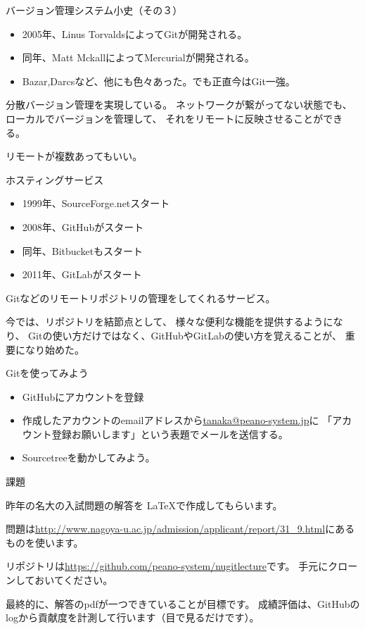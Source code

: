 \documentclass[12pt, unicode]{beamer}
\begin{document}
\begin{frame}{バージョン管理システム小史（その３）}
\begin{itemize}
\item 2005年、Linus TorvaldsによってGitが開発される。
\item 同年、Matt MckallによってMercurialが開発される。
\item Bazar,Darcsなど、他にも色々あった。でも正直今はGit一強。
\end{itemize}

分散バージョン管理を実現している。
ネットワークが繋がってない状態でも、
ローカルでバージョンを管理して、
それをリモートに反映させることができる。

リモートが複数あってもいい。

\end{frame}
\begin{frame}{ホスティングサービス}
\begin{itemize}
\item 1999年、SourceForge.netスタート
\item 2008年、GitHubがスタート
\item 同年、Bitbucketもスタート
\item 2011年、GitLabがスタート
\end{itemize}

Gitなどのリモートリポジトリの管理をしてくれるサービス。

今では、リポジトリを結節点として、
様々な便利な機能を提供するようになり、
Gitの使い方だけではなく、GitHubやGitLabの使い方を覚えることが、
重要になり始めた。


\end{frame}
\begin{frame}{Gitを使ってみよう}

\begin{itemize}
\item GitHubにアカウントを登録
\item 作成したアカウントのemailアドレスから\url{tanaka@peano-system.jp}に
「アカウント登録お願いします」という表題でメールを送信する。
\item Sourcetreeを動かしてみよう。
\end{itemize}

\end{frame}
\begin{frame}{課題}

昨年の名大の入試問題の解答を \LaTeX で作成してもらいます。

問題は\url{http://www.nagoya-u.ac.jp/admission/applicant/report/31_9.html}にあるものを使います。

リポジトリは\url{https://github.com/peano-system/nugitlecture}です。
手元にクローンしておいてください。

最終的に、解答のpdfが一つできていることが目標です。
成績評価は、GitHubのlogから貢献度を計測して行います（目で見るだけです）。

\end{frame}
\end{document}
